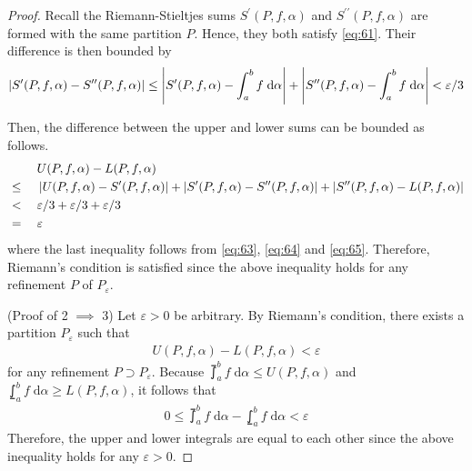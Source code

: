 \documentclass[thmcnt=section, 12pt]{my-elegantbook}
\begin{document}
\begin{proof}
    Recall the Riemann-Stieltjes sums $S^{\prime}(P,f,\alpha)$ and $S^{\prime\prime}(P,f,\alpha)$ are formed with the same partition $P$. Hence, they both satisfy \eqref{eq:61}. Their difference is then bounded by 
    \begin{align}
        \left\lvert S^{\prime}(P,f,\alpha) - S^{\prime\prime}(P,f,\alpha) \right\rvert
        \leq \left\lvert S^{\prime}(P,f,\alpha) - \int_{a}^{b} f \; \mathrm{d}\alpha \right\rvert
        + \left\lvert S^{\prime\prime}(P,f,\alpha) - \int_{a}^{b} f \; \mathrm{d}\alpha \right\rvert
        < \varepsilon / 3
        \label{eq:65}
    \end{align} 

    Then, the difference between the upper and lower sums can be bounded as follows.
    \begin{alignat*}{2}
        &&\;& U(P,f,\alpha) - L(P,f,\alpha) \\
        &\leq&& \left\lvert U(P,f,\alpha) - S^\prime(P,f,\alpha) \right\rvert
        + \left\lvert S^\prime(P,f,\alpha) - S^{\prime\prime}(P,f,\alpha) \right\rvert
        + \left\lvert S^{\prime\prime}(P,f,\alpha) - L(P,f,\alpha) \right\rvert \\
        &<&& \varepsilon / 3 + \varepsilon / 3 + \varepsilon / 3 \\
        &=&& \varepsilon
    \end{alignat*}
    where the last inequality follows from \eqref{eq:63}, \eqref{eq:64} and \eqref{eq:65}. Therefore, Riemann's condition is satisfied since the above inequality holds for any refinement $P$ of $P_\varepsilon$.

    (Proof of 2 $\implies$ 3) Let $\varepsilon > 0$ be arbitrary. By Riemann's condition, there exists a partition $P_\varepsilon$ such that 
    \begin{align*}
        U(P,f,\alpha) - L(P,f,\alpha) < \varepsilon
    \end{align*}
    for any refinement $P \supset P_\varepsilon$. Because $\upint_a^b f \; \mathrm{d}\alpha \leq U(P,f,\alpha)$ and $\lowint_a^b f \; \mathrm{d}\alpha \geq L(P,f,\alpha)$, it follows that 
    \begin{align*}
        0 \leq \upint_a^b f \; \mathrm{d}\alpha - \lowint_a^b f \; \mathrm{d}\alpha
        < \varepsilon
    \end{align*}
    Therefore, the upper and lower integrals are equal to each other since the above inequality holds for any $\varepsilon > 0$.


\end{proof}
\end{document}
